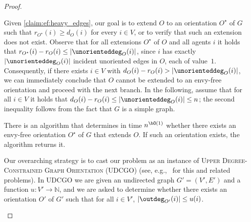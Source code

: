 \documentclass[11pt,letterpaper]{article}
\begin{document}
\begin{proof}
\begin{nestedproof}
    \end{nestedproof}
    Given \cref{claim:ef:heavy_edges},
    our goal is to extend $O$ to an orientation $O^\star$ of $G$ such that $r_{O^\star}(i) \ge d_{O}(i)$ for every $i \in V$,
    or to verify that such an extension does not exist.
    Observe that for all extensions $O^\star$ of $O$ and all agents $i$ it holds that $r_{O^\star}(i) - r_O(i) \le |\unorienteddeg_O(i)|$,
    since $i$ has exactly $|\unorienteddeg_O(i)|$ incident unoriented edges in $O$, each of value~$1$.
    Consequently, if there exists $i \in V$ with $d_O(i) - r_O(i) > |\unorienteddeg_O(i)|$,
    we can immediately conclude that $O$ cannot be extended to an envy-free orientation and proceed with the next branch.
    In the following, assume that for all $i \in V$ it holds that $d_O(i) - r_O(i) \le |\unorienteddeg_O(i)| \le n$;
    the second inequality follows from the fact that $G$ is a simple graph.

    \begin{claim}\label{claim:ef:heavy_edges:UDCGO}
        There is an algorithm that determines in time $n^{\bO(1)}$ whether there exists an envy-free orientation $O^\star$ of $G$
        that extends $O$. If such an orientation exists, the algorithm returns it.
    \end{claim}

    \begin{nestedproof}
        Our overarching strategy is to cast our problem as an instance of \textsc{Upper Degree-Constrained Graph Orientation} (UDCGO)
        (see, e.g.,~\cite{approx/CyganK15,FrankGyarfas1978,soda/Gabow06} for this and related problems).
        In UDCGO we are given an undirected graph $G' = (V',E')$ and a function $u \colon V' \to \mathbb{N}$,
        and we are asked to determine whether there exists
        an orientation $O'$ of $G'$ such that for all $i \in V'$, $|\outdeg_{O'}(i)| \le u(i)$.



\end{nestedproof}
\end{proof}
\end{document}
